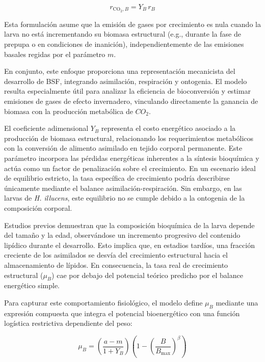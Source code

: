 \begin{equation}
r_{\mathrm{CO_2},B} = Y_B \, r_B
\label{eq:CO2_growth}
\end{equation}

Esta formulación asume que la emisión de gases por crecimiento es nula cuando la larva no está 
incrementando su biomasa estructural (e.g., durante la fase de prepupa o en condiciones de inanición), 
independientemente de las emisiones basales regidas por el parámetro $m$.

En conjunto, este enfoque proporciona una representación mecanicista del desarrollo de BSF, 
integrando asimilación, respiración y ontogenia. El modelo resulta especialmente útil para analizar 
la eficiencia de bioconversión y estimar emisiones de gases de efecto invernadero, vinculando 
directamente la ganancia de biomasa con la producción metabólica de $CO_2$.

El coeficiente adimensional $Y_B$ representa el costo energético asociado a la producción de 
biomasa estructural, relacionando los requerimientos metabólicos con la conversión de alimento 
asimilado en tejido corporal permanente. Este parámetro incorpora las pérdidas energéticas 
inherentes a la síntesis bioquímica y actúa como un factor de penalización sobre el crecimiento. 
En un escenario ideal de equilibrio estricto, la tasa específica de crecimiento podría describirse 
únicamente mediante el balance asimilación-respiración. Sin embargo, en las larvas de 
\textit{H. illucens}, este equilibrio no se cumple debido a la ontogenia de la composición corporal.

Estudios previos demuestran que la composición bioquímica de la larva depende del tamaño y la edad, 
observándose un incremento progresivo del contenido lipídico durante el desarrollo. Esto implica que, 
en estadios tardíos, una fracción creciente de los asimilados se desvía del crecimiento estructural 
hacia el almacenamiento de lípidos. En consecuencia, la tasa real de crecimiento estructural 
($\mu_B$) cae por debajo del potencial teórico predicho por el balance energético simple.

Para capturar este comportamiento fisiológico, el modelo define $\mu_B$ mediante una expresión 
compuesta que integra el potencial bioenergético con una función logística restrictiva dependiente del peso:

\begin{equation}
\mu_B = \left( \frac{a - m}{1 + Y_B} \right) \left( 1 - \left( \frac{B}{B_{\max}} \right)^{\beta} \right)
\label{eq:muB}
\end{equation}


